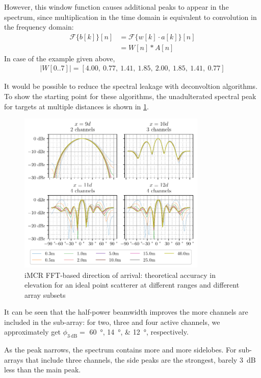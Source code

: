 However, this window function causes additional peaks to appear in the spectrum,
since multiplication in the time domain is equivalent to convolution in the frequency domain:
\begin{align*}
    \mathcal{F}\{b[k]\}[n] & = \mathcal{F}\{w[k] \cdot  a[k]   \}[n] \\
                           & = W[n] * A[n]
\end{align*}
In case of the example given above,
\begin{align*}
    |W[0..7]| = [4.00,\ 0.77,\ 1.41,\ 1.85,\ 2.00,\ 1.85,\ 1.41,\ 0.77]
\end{align*}

It would be possible to reduce the spectral leakage with deconvoltion algorithms.
To show the starting point for these algorithms,
the unadulterated spectral peak for targets at multiple distances is shown in \cref{fig:fft_elv_peak}.

\begin{figure}[h]
    \centering
    \includegraphics[width=0.8\textwidth]{../figures/fft_elv_peak.pdf}
    \caption{iMCR FFT-based direction of arrival: theoretical accuracy in elevation for an ideal point scatterer at different ranges and different array subsets}
    \label{fig:fft_elv_peak}
\end{figure}

It can be seen that the half-power beamwidth improves the more channels are included in the sub-array:
for two, three and four active channels, we approximately get
$\phi_{\SI{3}{\dB}}=$ \SIlist{60;14;12}{\degree}, respectively.

As the peak narrows, the spectrum contains more and more sidelobes.
For sub-arrays that include three channels, the side peaks are the strongest,
barely \SI{3}{\dB} less than the main peak. \\

